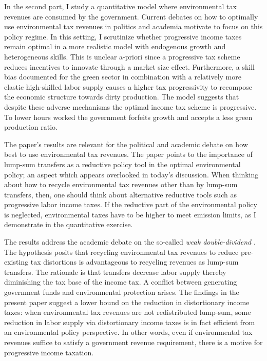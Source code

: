 In the second part, I study a quantitative model where environmental tax revenues are consumed by the government. Current debates on how to optimally use environmental tax revenues in politics \citep{Baker2017TheDividends} and academia \citep[e.g.][]{Fried2018TheGenerations, Carattini2018} motivate to focus on this policy regime. In this setting, I scrutinize whether progressive income taxes remain optimal in a more realistic model with endogenous growth and heterogeneous skills. This is unclear a-priori since a progressive tax scheme reduces incentives to innovate through a market size effect. Furthermore, a skill bias documented for the green sector \citep{Consoli2016DoCapital} in combination with a relatively more elastic high-skilled labor supply causes a higher tax progressivity to recompose the economic structure towards dirty production. The model suggests that despite these adverse mechanisms the optimal income tax scheme is progressive. To lower hours worked the government forfeits growth and accepts a less green production ratio.  

The paper's results are relevant for the political and academic debate on how best to use environmental tax revenues. The paper points to the importance of lump-sum transfers as a reductive policy tool in the optimal environmental policy; an aspect which appears overlooked in today's discussion.%
When thinking about how to recycle environmental tax revenues other than by lump-sum transfers, then, one should think about alternative reductive tools such as progressive labor income taxes. 
If the reductive part of the environmental policy is neglected, environmental taxes have to be higher to meet emission limits, as I demonstrate in the quantitative exercise.

The results address the academic debate on the so-called \textit{weak double-dividend} \citep[for example:][]{LansBovenberg1994EnvironmentalTaxation, LansBovenberg1996OptimalAnalyses}. The hypothesis posits that recycling environmental tax revenues to reduce pre-existing tax distortions is advantageous to recycling  revenues as lump-sum transfers. The rationale is that transfers decrease labor supply thereby diminishing the tax base of the income tax. A conflict between generating government funds and environmental protection arises. The findings in the present paper suggest a lower bound on the reduction in distortionary income taxes: when environmental tax revenues are not redistributed lump-sum, some reduction in labor supply via distortionary income taxes is in fact efficient from an environmental policy perspective. In other words, even if environmental tax revenues suffice to satisfy a government revenue requirement, there is a motive for progressive income taxation. 

